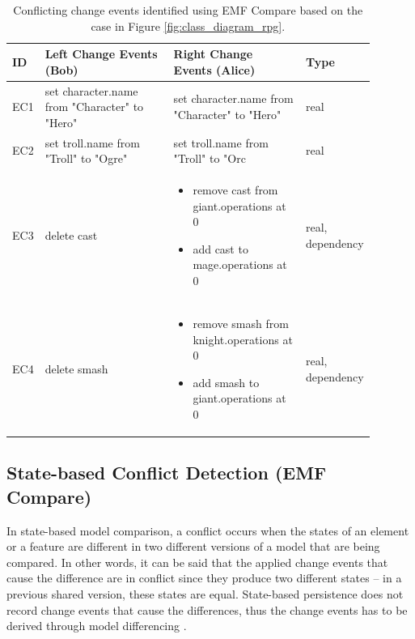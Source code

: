 \begin{table}[ht]
  \centering
  \caption{Conflicting change events identified using EMF Compare based on the case in Figure \ref{fig:class_diagram_rpg}.}
  \label{table:emfc_conflicts}
  \begin{tabular}{|p{0.04\linewidth}|p{0.37\linewidth}|p{0.37\linewidth}|
      p{0.11\linewidth}|}
    \hline
    \textbf{ID} & 
    \textbf{Left Change Events (Bob)} & 
    \textbf{Right Change Events (Alice)} & 
    \textbf{Type}\\ 
    \hline
    EC1 & 
    set character.name from "Character" to "Hero" & 
    set character.name from "Character" to "Hero" & 
    real \\
    \hline
    EC2 & set troll.name from "Troll" to "Ogre" & 
    set troll.name from "Troll" to "Orc & 
    real \\ 
    \hline
    EC3 & 
    delete cast
    & 
    \begin{minipage}[t]{\linewidth}
      \raggedright
      \begin{itemize}[leftmargin=0pt]
        \setlength
        \item[] remove cast from giant.operations at 0
        \item[] add cast to mage.operations at 0
      \end{itemize}
    \end{minipage}
    & 
    real, dependency\\
    \hline
    EC4 & 
    delete smash
    & 
    \begin{minipage}[t]{\linewidth}
      \raggedright
      \begin{itemize}[leftmargin=0pt]
        \setlength
        \item[] remove smash from knight.operations at 0
        \item[] add smash to giant.operations at 0
      \end{itemize}
    \end{minipage}
    & 
    real, dependency\\
    \hline
  \end{tabular}
\end{table}

\subsection{State-based Conflict Detection (EMF Compare)}
\label{sec:emfcompare_conflict_detection}

In state-based model comparison, a conflict occurs when the states of an element or a feature are different in two different versions of a model that are being compared. In other words, it can be said that the applied change events that cause the difference are in conflict since they produce two different states -- in a previous shared version, these states are equal. State-based persistence does not record change events that cause the differences, thus the change events has to be derived through model differencing \cite{emfcompare2018developer,yohannis2019efficient}. 

